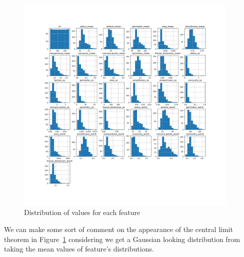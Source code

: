 \documentclass[12pt, a4paper]{article}
\begin{document}
    \begin{figure}[H]
        \begin{center}
            \includegraphics[width=0.95\textwidth]{figures/Data feature histograms.png}
        \end{center}
        \caption{Distribution of values for each feature}\label{fig:hists}
    \end{figure}

\begin{multicols}{2}

    We can make some sort of comment on the appearance of the central limit theorem in Figure~\ref{fig:hists} considering we get a Gaussian looking distribution \cite{} from taking the mean values of feature's distributions.
    \newline

\end{multicols}
\end{document}
